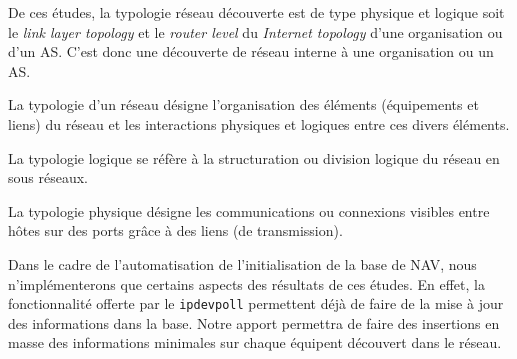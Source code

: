 De ces études, la typologie réseau découverte est de type physique et logique soit le \emph{link layer topology} et le \emph{router level} du \emph{Internet topology} d'une organisation ou d'un AS. C'est donc une découverte de réseau interne à une organisation ou un AS.

La typologie d'un réseau désigne l'organisation des éléments (équipements et liens) du réseau et les interactions physiques et logiques entre ces divers éléments.

La typologie logique se réfère à la structuration ou division logique du réseau en sous réseaux. %

La typologie physique désigne les communications ou connexions visibles entre hôtes sur des ports grâce à des liens (de transmission).

Dans le cadre de l'automatisation de l'initialisation de la base de NAV, nous n'implémenterons que certains aspects des résultats de ces études. En effet, la fonctionnalité offerte par le \texttt{ipdevpoll} permettent déjà de faire de la mise à jour des informations dans la base. Notre apport permettra de faire des insertions en masse des informations minimales sur chaque équipent découvert dans le réseau.

